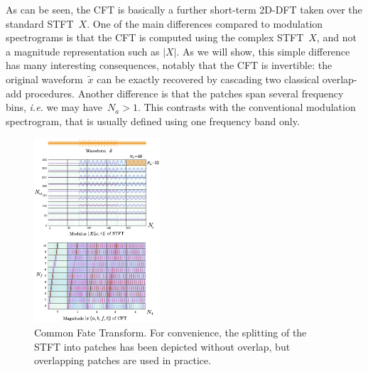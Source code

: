 As can be seen, the CFT is basically a further short-term 2D-DFT taken over
the standard STFT~$X$. One of the main differences compared to modulation spectrograms
is that the CFT is computed using the complex STFT~$X$, and not a magnitude representation such as $\left|X\right|$. As we will
show, this simple difference has many interesting consequences, notably
that the CFT is invertible: the original waveform~$\tilde{x}$ can
be exactly recovered by cascading two classical overlap-add procedures. Another difference
is that the patches span several frequency bins, \emph{i.e.} we may have~$N_{a}>1$.
This contrasts with the conventional modulation spectrogram, that
is usually defined using one frequency band only.

\begin{figure}[t]
\centering
\includegraphics[width=0.9\columnwidth]{Chapters/commonfate/figures/CFT}

\caption{Common Fate Transform. For convenience, the splitting of the STFT
into patches has been depicted without overlap, but overlapping patches
are used in practice\label{fig:CFT}.}
\end{figure}

